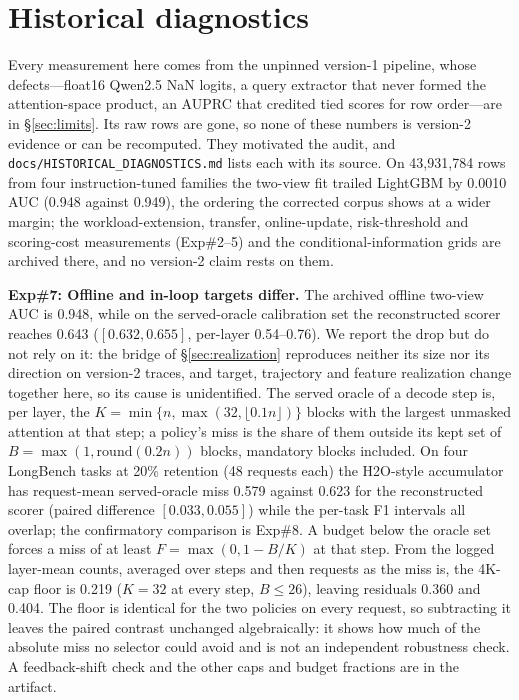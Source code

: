 \section{Historical diagnostics}
\label{sec:historical}
Every measurement here comes from the unpinned version-1 pipeline, whose
defects---float16 Qwen2.5 NaN logits, a query extractor that never formed the
attention-space product, an AUPRC that credited tied scores for row order---are in
\S\ref{sec:limits}. Its raw rows are gone, so none of these numbers is version-2
evidence or can be recomputed. They motivated the audit, and
\texttt{docs/HISTORICAL\_DIAGNOSTICS.md} lists each with its source. On 43,931,784
rows from four instruction-tuned families the two-view fit trailed LightGBM by 0.0010
AUC (0.948 against 0.949), the ordering the corrected corpus shows at a wider margin;
the workload-extension, transfer, online-update, risk-threshold and scoring-cost
measurements (Exp\#2--5) and the conditional-information grids are archived there, and
no version-2 claim rests on them.

\textbf{Exp\#7: Offline and in-loop targets differ.} The archived offline two-view
AUC is 0.948, while on the served-oracle calibration set the reconstructed scorer
reaches 0.643 ($[0.632,0.655]$, per-layer 0.54--0.76). We report the drop but do not
rely on it: the bridge of \S\ref{sec:realization} reproduces neither its size nor its
direction on version-2 traces, and target, trajectory and feature realization change
together here, so its cause is unidentified. The served oracle of a decode step is,
per layer, the $K=\min\{n,\max(32,\lfloor0.1n\rfloor)\}$ blocks with the largest
unmasked attention at that step; a policy's miss is the share of them outside its kept
set of $B=\max(1,\mathrm{round}(0.2n))$ blocks, mandatory blocks included. On four
LongBench tasks at 20\% retention
(48 requests each) the H2O-style accumulator has request-mean served-oracle miss 0.579
against 0.623 for the reconstructed scorer (paired difference $[0.033,0.055]$) while
the per-task F1 intervals all overlap; the confirmatory comparison is Exp\#8. A budget
below the oracle set forces a miss of at least $F=\max(0,1-B/K)$ at that step. From the
logged layer-mean counts, averaged over steps and then requests as the miss is, the
4K-cap floor is 0.219 ($K=32$ at every step, $B\le26$), leaving residuals 0.360 and
0.404. The floor is identical for the two policies on every request, so subtracting
it leaves the paired contrast unchanged algebraically: it shows how much of the
absolute miss no selector could avoid and is not an independent robustness check. A
feedback-shift check and the other caps and budget fractions are in the artifact.
